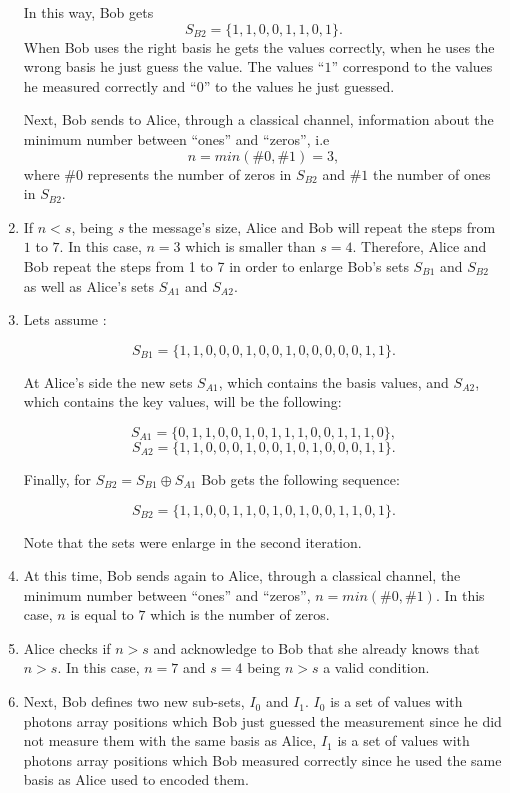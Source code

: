 \begin{enumerate}
      In this way, Bob gets $$S_{B2} = \{1,1,0,0,1,1,0,1 \}.$$ When Bob uses the right basis he gets the values correctly, when he uses the wrong basis he just guess the value. The values ``$1$'' correspond to the values he measured correctly and ``$0$'' to the values he just guessed.

       Next, Bob sends to Alice, through a classical channel, information about the minimum number between ``ones'' and ``zeros'', i.e $$n=min(\#0,\#1)=3,$$ where $\#0$ represents the number of zeros in $S_{B2}$ and $\#1$ the number of ones in $S_{B2}$.

  \item If $n<s$, being \textit{s} the message's size, Alice and Bob will repeat the steps from $1$ to $7$. In this case, $n=3$ which is smaller than $s=4$. Therefore, Alice and Bob repeat the steps from 1 to 7 in order to enlarge Bob's sets $S_{B1}$ and $S_{B2}$ as well as Alice's sets $S_{A1}$ and $S_{A2}$.

  \item Lets assume :

   $$S_{B1}= \{1,1,0,0,0,1,0,0,1,0,0,0,0,0,1,1 \}.$$

    At Alice's side the new sets $S_{A1}$, which contains the basis values, and $S_{A2}$, which contains the key values, will be the following:

    $$S_{A1}=\{0,1,1,0,0,1,0,1,1,1,0,0,1,1,1,0 \},$$ $$S_{A2}=\{1,1,0,0,0,1,0,0,1,0,1,0,0,0,1,1 \}.$$

    Finally, for $S_{B2}=S_{B1} \oplus S_{A1}$ Bob gets the following sequence:

    $$S_{B2}= \{1,1,0,0,1,1,0,1,0,1,0,0,1,1,0,1 \}.$$

    Note that the sets were enlarge in the second iteration.

  \item At this time, Bob sends again to Alice, through a classical channel, the minimum number between  ``ones'' and ``zeros'',  $n=min(\#0,\#1)$. In this case, $n$ is equal to $7$ which is the number of zeros.

  \item Alice checks if $n>s$ and acknowledge to Bob that she already knows that $n>s$. In this case, $n=7$ and $s=4$ being $n>s$ a valid condition.

  \item Next, Bob defines two new sub-sets, $I_{0}$ and $I_{1}$. $I_{0}$ is a set of values with photons array positions which Bob just guessed the measurement since he did not measure them with the same basis as Alice, $I_{1}$ is a set of values with photons array positions which Bob measured correctly since he used the same basis as Alice used to encoded them.


\end{enumerate}
